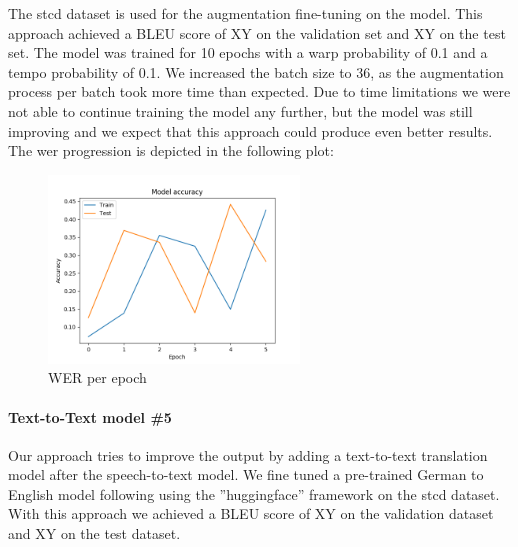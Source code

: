 The \gls{stcd} dataset is used for the augmentation fine-tuning on the  model. This approach achieved a BLEU score of XY on the validation set and XY on the test set. The model was trained for
10 epochs with a warp probability of 0.1 and a tempo probability of 0.1. We increased the batch size to 36, as the augmentation process per batch took more time than expected. Due to time limitations we
were not able to continue training the model any further, but the model was still improving and we expect that this approach could produce even better results. The \gls{wer} progression is depicted in the following plot:
\begin{figure}[H]
    \includegraphics[width=\linewidth,height=5cm]{img/werPlot.png}
    \caption{WER per epoch}
    \label{fig:werPerEpoch}
\end{figure}

\paragraph{Text-to-Text model \#5} Our  approach tries to improve the output by adding a text-to-text translation model after the speech-to-text model. We fine tuned a pre-trained German to
English model following  using the ''huggingface'' framework \cite{wolf-etal-2020-transformers} on the \gls{stcd} dataset. With this approach we achieved a BLEU score of XY on the validation dataset and
XY on the test dataset.
